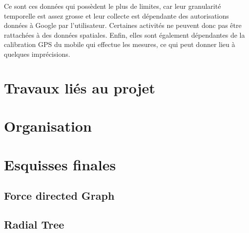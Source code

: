 \documentclass[a4paper, 11pt]{article}
\begin{document}
        Ce sont ces données qui possèdent le plus de limites, car leur granularité temporelle est assez grosse et leur collecte est dépendante des autorisations données à Google par l'utilisateur. Certaines activités ne peuvent donc pas être rattachées à des données spatiales. Enfin, elles sont également dépendantes de la calibration GPS du mobile qui effectue les mesures, ce qui peut donner lieu à quelques imprécisions.

    \section{Travaux liés au projet}

    \section{Organisation}

    \section{Esquisses finales}
        \subsection{Force directed Graph}

        \subsection{Radial Tree}
\end{document}
